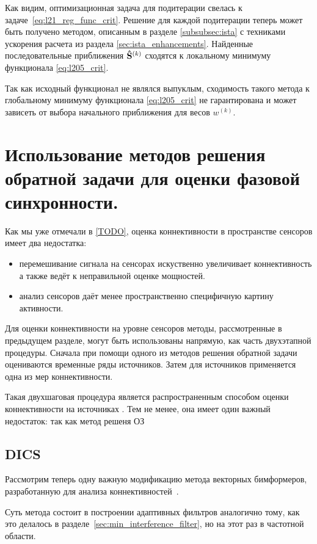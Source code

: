 Как видим, оптимизационная задача для подитерации свелась к задаче~\ref{eq:l21_reg_func_crit}.
Решение для каждой подитерации теперь может быть получено методом, описанным в разделе
\ref{subsubsec:ista} с техниками ускорения расчета из раздела \ref{sec:ista_enhancements}.
Найденные последовательные приближения $\mathbf{\hat{S}}^{(k)}$ сходятся к локальному минимуму
функционала \ref{eq:l205_crit}.

Так как исходный функционал не являлся выпуклым, сходимость такого метода к глобальному минимуму
функционала \ref{eq:l205_crit} не гарантирована и может зависеть от выбора начального приближения
для весов $w^{(k)}$.

\section{Использование методов решения обратной задачи для оценки фазовой синхронности.}
Как мы уже отмечали в \ref{TODO}, оценка коннективности в пространстве сенсоров
имеет два недостатка:
\begin{itemize}
    \item перемешивание сигнала на сенсорах искуственно увеличивает коннективность
        а также ведёт к неправильной оценке мощностей.
    \item анализ сенсоров даёт менее пространственно специфичную картину активности.
\end{itemize}

Для оценки коннективности на уровне сенсоров методы, рассмотренные в предыдущем разделе, могут быть использованы
напрямую, как часть двухэтапной процедуры. Сначала при помощи одного из методов решения обратной задачи
оцениваются временные ряды источников. Затем для источников применяется одна из мер коннективности.

Такая двухшаговая процедура является распространенным способом
оценки коннективности на источниках \cite{TODO:add some refs}. Тем не менее,
она имеет один важный недостаток: так как метод решеня ОЗ


\subsection{DICS}
\label{DICS_subsection}
Рассмотрим теперь одну важную модификацию метода векторных бимформеров,
разработанную для анализа коннективностей~\cite{DICS}.

Суть метода состоит в построении адаптивных фильтров аналогично тому, как это делалось 
в разделе~\ref{sec:min_interference_filter}, но на этот раз в частотной области.

